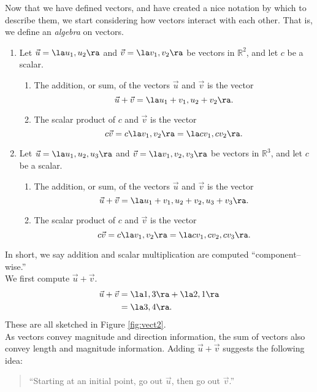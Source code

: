 Now that we have defined vectors, and have created a nice notation by which to describe them, we start considering how vectors interact with each other. That is, we define an \textit{algebra} on vectors. 
\clearpage

{\begin{enumerate}
	\item Let $\vec u = \la u_1,u_2\ra$ and $\vec v = \la v_1,v_2\ra$ be vectors in $\mathbb{R}^2$, and let $c$ be a scalar. 
				\begin{enumerate}
					\item The addition, or sum, of the vectors $\vec u$ and $\vec v$ is the vector
					$$\vec u+\vec v = \la u_1+v_1, u_2+v_2\ra.$$
					\item	The scalar product of $c$ and $\vec v$ is the vector 
					$$c\vec v = c\la v_1,v_2\ra = \la cv_1,cv_2\ra.$$
				\end{enumerate}
	\item Let $\vec u = \la u_1,u_2,u_3\ra$ and $\vec v = \la v_1,v_2,v_3\ra$ be vectors in $\mathbb{R}^3$, and let $c$ be a scalar. 
				\begin{enumerate}
					\item The addition, or sum, of the vectors $\vec u$ and $\vec v$ is the vector
					$$\vec u+\vec v = \la u_1+v_1, u_2+v_2, u_3+v_3\ra.$$
					\item	The scalar product of $c$ and $\vec v$ is the vector 
					$$c\vec v = c\la v_1,v_2\ra = \la cv_1,cv_2,cv_3\ra.$$
				\end{enumerate}
\end{enumerate}
}

In short, we say addition and scalar multiplication are computed ``component--wise.''\\

	{We first compute $\vec u +\vec v$. 
	\begin{align*}
	\vec u+\vec v &= \la 1,3\ra + \la 2,1\ra\\
								&= \la 3,4\ra.
	\end{align*}
	These are all sketched in Figure \ref{fig:vect2}.
}\\
	
As vectors convey magnitude and direction information, the sum of vectors also convey length and magnitude information. Adding $\vec u+\vec v$ suggests the following idea:
\begin{quotation}
``Starting at an initial point, go out $\vec u$, then go out $\vec v$.''
\end{quotation}

